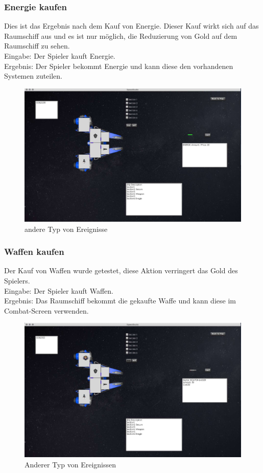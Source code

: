 \documentclass[12pt]{article}
\begin{document}
\subsubsection{Energie kaufen}
Dies ist das Ergebnis nach dem Kauf von Energie. Dieser Kauf wirkt sich auf das Raumschiff aus und es ist nur möglich, die Reduzierung von Gold auf dem Raumschiff zu sehen.\\
Eingabe: Der Spieler kauft Energie.\\
Ergebnis: Der Spieler bekommt Energie und kann diese den vorhandenen Systemen zuteilen.\\
\begin{figure}[htp]
\centering
\includegraphics[scale=0.4]{TestProtocolBilder/energie.jpg}
\caption{andere Typ von Ereignisse}
\end{figure}
\newpage
\subsubsection{Waffen kaufen}
Der Kauf von Waffen wurde getestet, diese Aktion verringert das Gold des Spielers.\\
Eingabe: Der Spieler kauft Waffen.\\
Ergebnis: Das Raumschiff bekommt die gekaufte Waffe und kann diese im Combat-Screen verwenden.
\begin{figure}[htp]
\centering
\includegraphics[scale=0.4]{TestProtocolBilder/weaponkaufen.jpg}
\caption{Anderer Typ von Ereignissen}
\end{figure}
\newpage
\end{document}
